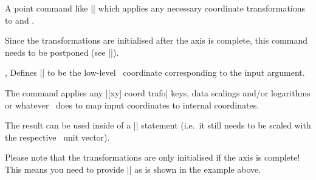 \begin{command}{\pgfplotspointaxisxy{}}
	A point command like |\pgfpointxy| which applies any necessary coordinate transformations to  and .

	Since the transformations are initialised after the axis is complete, this command needs to be postponed (see |\pgfplotsextra|).
\end{command}

\begin{commandlist}{%
	\pgfplotstransformcoordinatex{},%
	\pgfplotstransformcoordinatey{}}
	Defines |\pgfmathresult| to be the low-level \PGF\ coordinate corresponding to the input argument.

	The command applies any |[xy] coord trafo| keys, data scalings and/or logarithms or whatever \PGFPlots\ does to map input coordinates to internal coordinates.

	The result can be used inside of a |\pgfpointxy| statement (i.e.\ it still needs to be scaled with the respective \PGF\ unit vector).
\begin{codeexample}[]
\end{codeexample}
	Please note that the transformations are only initialised if the axis is complete! This means you need to provide |\pgfplotsextra| as is shown in the example above.
\end{commandlist}
